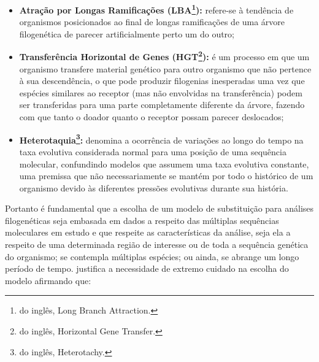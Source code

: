 \documentclass[english,brazilian]{UNISINOSmonografia} %
\begin{document}
\begin{itemize}
	
	\item \textbf{Atração por Longas Ramificações (LBA\footnote{do inglês, Long Branch Attraction.}):}
	refere-se à tendência de organismos posicionados ao final de longas ramificações de uma árvore filogenética de parecer artificialmente perto um do outro;
	
	\item \textbf{Transferência Horizontal de Genes (HGT\footnote{do inglês, Horizontal Gene Transfer.}):}
	é um processo em que um organismo transfere material genético para outro organismo que não pertence à sua descendência, o que pode produzir filogenias inesperadas uma vez que espécies similares ao receptor (mas não envolvidas na transferência) podem ser transferidas para uma parte completamente diferente da árvore, fazendo com que tanto o doador quanto o receptor possam parecer deslocados;
	
	\item \textbf{Heterotaquia\footnote{do inglês, Heterotachy.}:} 
	denomina a ocorrência de variações ao longo do tempo na taxa evolutiva considerada normal para uma posição de uma sequência molecular, confundindo modelos que assumem uma taxa evolutiva constante, uma premissa que não necessariamente se mantém por todo o histórico de um organismo devido às diferentes pressões evolutivas durante sua história.

\end{itemize}


Portanto é fundamental que a escolha de um modelo de substituição para análises filogenéticas seja embasada em dados a respeito das múltiplas sequências moleculares em estudo e que respeite as características da análise, seja ela a respeito de uma determinada região de interesse ou de toda a sequência genética do organismo; se contempla múltiplas espécies; ou ainda, se abrange um longo período de tempo.
 justifica a necessidade de extremo cuidado na escolha do modelo afirmando que:
\end{document}
